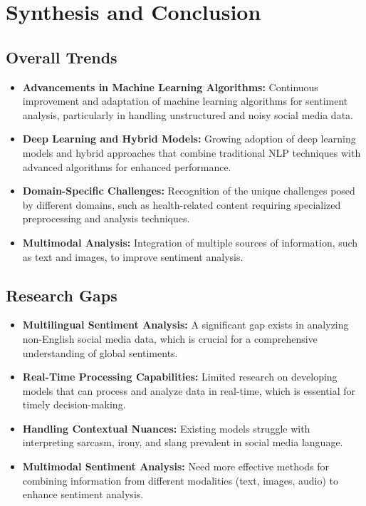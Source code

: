 \documentclass{IEEEtran}
\begin{document}
\section{Synthesis and Conclusion}

\subsection{Overall Trends}
\begin{itemize}
    \item \textbf{Advancements in Machine Learning Algorithms:} Continuous improvement and adaptation of machine learning algorithms for sentiment analysis, particularly in handling unstructured and noisy social media data.
    \item \textbf{Deep Learning and Hybrid Models:} Growing adoption of deep learning models and hybrid approaches that combine traditional NLP techniques with advanced algorithms for enhanced performance.
    \item \textbf{Domain-Specific Challenges:} Recognition of the unique challenges posed by different domains, such as health-related content requiring specialized preprocessing and analysis techniques.
    \item \textbf{Multimodal Analysis:} Integration of multiple sources of information, such as text and images, to improve sentiment analysis.
\end{itemize}

\subsection{Research Gaps}
\begin{itemize}
    \item \textbf{Multilingual Sentiment Analysis:} A significant gap exists in analyzing non-English social media data, which is crucial for a comprehensive understanding of global sentiments.
    \item \textbf{Real-Time Processing Capabilities:} Limited research on developing models that can process and analyze data in real-time, which is essential for timely decision-making.
    \item \textbf{Handling Contextual Nuances:} Existing models struggle with interpreting sarcasm, irony, and slang prevalent in social media language.
    \item \textbf{Multimodal Sentiment Analysis:} Need more effective methods for combining information from different modalities (text, images, audio) to enhance sentiment analysis.
\end{itemize}
\end{document}
